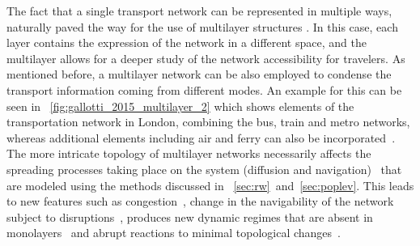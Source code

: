 The fact that a single transport network can be represented in multiple ways, naturally paved the way for the use of multilayer structures \cite{kurant_2006_layered,kurant_2006_extraction}. In this case, each layer contains the expression of the network in a different space, and the multilayer allows for a deeper study of the network accessibility for travelers. As mentioned before, a multilayer network can be also employed to condense the transport information coming from different modes. An example for this can be seen in \figurename~\ref{fig:gallotti_2015_multilayer_2} which shows elements of the transportation network in London, combining the bus, train and metro networks, whereas additional elements including air and ferry can also be incorporated~\cite{gallotti_2015_multilayer}. The more intricate topology of multilayer networks necessarily affects the spreading processes taking place on the system (diffusion and navigation)~\cite{dedomenico_2013_mathematical,gomez_2013_diffusion,kivela_2014_multilayer} that are modeled using the methods discussed in \sectionname~\ref{sec:rw}~and~\ref{sec:poplev}. This leads to new features such as congestion~\cite{sole_2016_congestion}, change in the navigability of the network subject to disruptions~\cite{dedomenico_2014_navigability, battiston_2016_efficient}, produces new dynamic regimes that are absent in monolayers~\cite{radicchi_2013_abrupt} and abrupt reactions to minimal topological changes~\cite{diakonova_2017_dynamical}.

